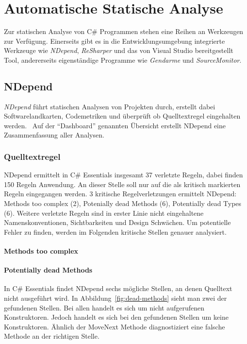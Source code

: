 %
\section{Automatische Statische Analyse}
Zur statischen Analyse von C\# Programmen stehen eine Reihen an Werkzeugen zur Verfügung. Einerseits gibt es in die Entwicklungsumgebung integrierte Werkzeuge wie \emph{NDepend}, \emph{ReSharper} und das von Visual Studio bereitgestellt Tool, andererseits eigenständige Programme wie \emph{Gendarme} und \emph{SourceMonitor}.

\subsection{NDepend}
\emph{NDepend} führt statischen Analysen von Projekten durch, erstellt dabei Softwarelandkarten, Codemetriken und überprüft ob Quelltextregel eingehalten werden.~\cite{ndepend} Auf der \enquote{Dashboard} genannten Übersicht erstellt NDepend eine Zusammenfassung aller Analysen. 

\subsubsection{Quelltextregel}
NDepend ermittelt in C\# Essentials insgesamt 37 verletzte Regeln, dabei finden 150 Regeln Anwendung. An dieser Stelle soll nur auf die als kritisch markierten Regeln eingegangen werden. 3 kritische Regelverletzungen ermittelt NDepend: Methods too complex (2), Potenially dead Methods (6), Potentially dead Types (6). Weitere verletzte Regeln sind in erster Linie nicht eingehaltene Namenskonventionen, Sichtbarkeiten und Design Schwächen. Um potentielle Fehler zu finden, werden im Folgenden kritische Stellen genauer analysiert.

\paragraph{Methods too complex}

\paragraph{Potentially dead Methods} In C\# Essentials findet NDepend sechs mögliche Stellen, an denen Quelltext nicht ausgeführt wird. In Abbildung~\ref{fig:dead-methods} sieht man zwei der gefundenen Stellen. Bei allen handelt es sich um nicht aufgerufenen Konstruktoren. Jedoch handelt es sich bei den gefundenen Stellen um keine Konstruktoren. Ähnlich der MoveNext Methode diagnostiziert eine falsche Methode an der richtigen Stelle. %

